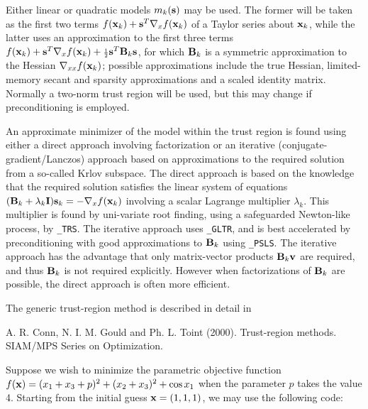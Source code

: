 \documentclass{galahad}
\begin{document}
Either linear or quadratic models $m_k({\mathbf{s}})$ may be used. The former will be
taken as the first two terms $f({\mathbf{x}}_k) + {\mathbf{s}}^T \nabla_x f({\mathbf{x}}_k)$
of a Taylor series about ${\mathbf{x}}_k$, while the latter uses an
approximation to the first three terms
$f({\mathbf{x}}_k) + {\mathbf{s}}^T \nabla_x f({\mathbf{x}}_k) + {\scriptstyle \frac{1}{2}}
{\mathbf{s}}^T {\mathbf{B}}_k {\mathbf{s}}$,
for which ${\mathbf{B}}_k$ is a symmetric approximation to the Hessian
$\nabla_{xx} f({\mathbf{x}}_k)$; possible approximations include the true Hessian,
limited-memory secant and sparsity approximations and a scaled identity matrix.
Normally a two-norm trust region will be used, but this may change
if preconditioning is employed.

An approximate minimizer of the model within the trust region
is found using either a direct approach involving factorization or an
iterative (conjugate-gradient/Lanczos) approach based on approximations
to the required solution from a so-called Krlov subspace. The direct
approach is based on the knowledge that the required solution
satisfies the linear system of equations $({\mathbf{B}}_k + \lambda_k {\mathbf{I}}) {\mathbf{s}}_k
= - \nabla_x f({\mathbf{x}}_k)$ involving a scalar Lagrange multiplier $\lambda_k$.
This multiplier is found by uni-variate root finding, using a safeguarded
Newton-like process, by {\tt \libraryname\_TRS}. The iterative approach
uses {\tt \libraryname\_GLTR}, and is best accelerated by preconditioning
with good approximations to ${\mathbf{B}}_k$ using {\tt \libraryname\_PSLS}. The
iterative approach has the advantage that only matrix-vector products
${\mathbf{B}}_k {\mathbf{v}}$ are required, and thus ${\mathbf{B}}_k$ is not required explicitly.
However when factorizations of ${\mathbf{B}}_k$ are possible, the direct approach
is often more efficient.
\vspace*{1mm}

\galreferences
\vspace*{1mm}

\noindent
The generic trust-region method is described in detail in
\vspace*{1mm}

\noindent
A. R. Conn, N. I. M. Gould and Ph. L. Toint (2000).
Trust-region methods.
SIAM/MPS Series on Optimization.


\galexamples
Suppose we wish to minimize the parametric objective function
$f({\mathbf{x}}) = ( x_1 + x_3 + p )^2 + ( x_2 + x_3 )^2 + \cos x_1$
when the parameter $p$ takes the value 4. Starting from the
initial guess ${\mathbf{x}} = (1,1,1)$,
we may use the following code:
\end{document}
